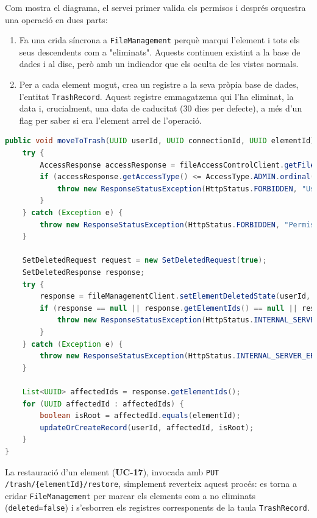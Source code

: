 Com mostra el diagrama, el servei primer valida els permisos i després orquestra una operació en dues parts:
\begin{enumerate}
    \item Fa una crida síncrona a \texttt{FileManagement} perquè marqui l'element i tots els seus descendents com a "eliminats". Aquests continuen existint a la base de dades i al disc, però amb un indicador que els oculta de les vistes normals.
    \item Per a cada element mogut, crea un registre a la seva pròpia base de dades, l'entitat \texttt{TrashRecord}. Aquest registre emmagatzema qui l'ha eliminat, la data i, crucialment, una data de caducitat (30 dies per defecte), a més d'un flag per saber si era l'element arrel de l'operació.
\end{enumerate}

\begin{lstlisting}[language=Java, caption={Mètode per moure un element a la paperera a `TrashService`}]
public void moveToTrash(UUID userId, UUID connectionId, UUID elementId) {
    try {
        AccessResponse accessResponse = fileAccessControlClient.getFileAccess(elementId, userId);
        if (accessResponse.getAccessType() <= AccessType.ADMIN.ordinal()) {
            throw new ResponseStatusException(HttpStatus.FORBIDDEN, "User does not have WRITE access to the element.");
        }
    } catch (Exception e) {
        throw new ResponseStatusException(HttpStatus.FORBIDDEN, "Permission check failed for the element");
    }

    SetDeletedRequest request = new SetDeletedRequest(true);
    SetDeletedResponse response;
    try {
        response = fileManagementClient.setElementDeletedState(userId, connectionId, elementId, request);
        if (response == null || response.getElementIds() == null || response.getElementIds().isEmpty()) {
            throw new ResponseStatusException(HttpStatus.INTERNAL_SERVER_ERROR, "Failed to move element to trash");
        }
    } catch (Exception e) {
        throw new ResponseStatusException(HttpStatus.INTERNAL_SERVER_ERROR, "Error communicating with file management service");
    }

    List<UUID> affectedIds = response.getElementIds();
    for (UUID affectedId : affectedIds) {
        boolean isRoot = affectedId.equals(elementId);
        updateOrCreateRecord(userId, affectedId, isRoot);
    }
}
\end{lstlisting}

La restauració d'un element (\textbf{UC-17}), invocada amb \texttt{PUT /trash/\{elementId\}/restore}, simplement reverteix aquest procés: es torna a cridar \texttt{FileManagement} per marcar els elements com a no eliminats (\texttt{deleted=false}) i s'esborren els registres corresponents de la taula \texttt{TrashRecord}.

